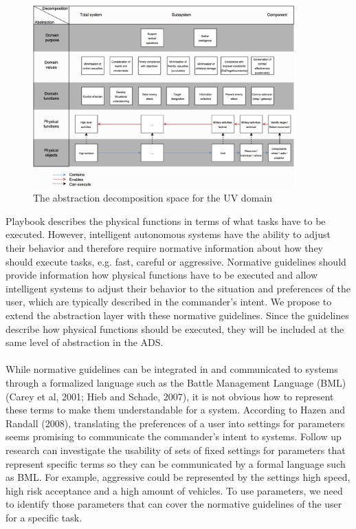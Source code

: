 \documentclass[twoside,twocolumn]{article}
\begin{document}
%
\begin{figure}[h]
	\centering
		\includegraphics[width=0.9\textwidth]{images/ads.png}
	\caption{The abstraction decomposition space for the UV domain}
	\label{fig:ads}
\end{figure}
%
Playbook describes the physical functions in terms of what tasks have to be executed. However, intelligent autonomous systems have the ability to adjust their behavior and therefore require normative information about how they should execute tasks, e.g. fast, careful or aggressive. Normative guidelines should provide information how physical functions have to be executed and allow intelligent systems to adjust their behavior to the situation and preferences of the user, which are typically described in the commander's intent. We propose to extend the abstraction layer with these normative guidelines. Since the guidelines describe how physical functions should be executed, they will be included at the same level of abstraction in the ADS.
\\\\
While normative guidelines can be integrated in and communicated to systems through a formalized language such as the Battle Management Language (BML) (Carey et al, 2001; Hieb and Schade, 2007), it is not obvious how to represent these terms to make them understandable for a system. According to Hazen and Randall (2008), translating the preferences of a user into settings for parameters seems promising to communicate the commander's intent to systems. Follow up research can investigate the usability of sets of fixed settings for parameters that represent specific terms so they can be communicated by a formal language such as BML. For example, aggressive could be represented by the settings high speed, high risk acceptance and a high amount of vehicles. To use parameters, we need to identify those parameters that can cover the normative guidelines of the user for a specific task.
\end{document}
